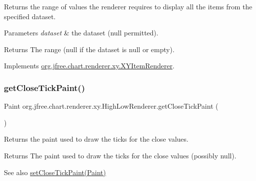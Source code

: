 Returns the range of values the renderer requires to display all the items from the specified dataset.


\begin{DoxyParams}{Parameters}
{\em dataset} & the dataset ({\ttfamily null} permitted).\\
\hline
\end{DoxyParams}
\begin{DoxyReturn}{Returns}
The range ({\ttfamily null} if the dataset is {\ttfamily null} or empty). 
\end{DoxyReturn}


Implements \mbox{\hyperlink{interfaceorg_1_1jfree_1_1chart_1_1renderer_1_1xy_1_1_x_y_item_renderer_af9ac6f440e99c73d343de7851e89496a}{org.\+jfree.\+chart.\+renderer.\+xy.\+X\+Y\+Item\+Renderer}}.

\mbox{\label{classorg_1_1jfree_1_1chart_1_1renderer_1_1xy_1_1_high_low_renderer_a948cf128b2e7f01d815dc351cd2f3286}} 
\subsubsection{\texorpdfstring{get\+Close\+Tick\+Paint()}{getCloseTickPaint()}}
{\footnotesize\ttfamily Paint org.\+jfree.\+chart.\+renderer.\+xy.\+High\+Low\+Renderer.\+get\+Close\+Tick\+Paint (\begin{DoxyParamCaption}{ }\end{DoxyParamCaption})}

Returns the paint used to draw the ticks for the close values.

\begin{DoxyReturn}{Returns}
The paint used to draw the ticks for the close values (possibly {\ttfamily null}).
\end{DoxyReturn}
\begin{DoxySeeAlso}{See also}
\mbox{\hyperlink{classorg_1_1jfree_1_1chart_1_1renderer_1_1xy_1_1_high_low_renderer_afda700a1415ace745064ee5f13a49c1d}{set\+Close\+Tick\+Paint(\+Paint)}} 
\end{DoxySeeAlso}
\mbox{\label{classorg_1_1jfree_1_1chart_1_1renderer_1_1xy_1_1_high_low_renderer_a5e9153dd2313078005e9eb7b6f5befae}} 
